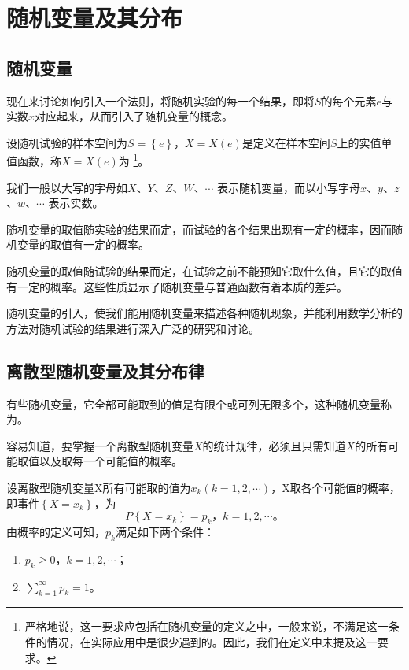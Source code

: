 \chapter{随机变量及其分布}

\section{随机变量}

现在来讨论如何引入一个法则，将随机实验的每一个结果，即将$ S $的每个元素$ e $与实数$ x $对应起来，从而引入了随机变量的概念。

\begin{definition}
	设随机试验的样本空间为$ S = \left\lbrace e \right\rbrace  $，$ X = X(e) $是定义在样本空间$ S $上的实值单值函数，称$ X = X(e) $为 \footnote{严格地说，这一要求应包括在随机变量的定义之中，一般来说，不满足这一条件的情况，在实际应用中是很少遇到的。因此，我们在定义中未提及这一要求。}。
\end{definition}

我们一般以大写的字母如$ X $、$ Y $、$ Z $、$ W $、$ \cdots $ 表示随机变量，而以小写字母$ x $、$ y $、$ z $、$ w $、$ \cdots $ 表示实数。

随机变量的取值随实验的结果而定，而试验的各个结果出现有一定的概率，因而随机变量的取值有一定的概率。

随机变量的取值随试验的结果而定，在试验之前不能预知它取什么值，且它的取值有一定的概率。这些性质显示了随机变量与普通函数有着本质的差异。

随机变量的引入，使我们能用随机变量来描述各种随机现象，并能利用数学分析的方法对随机试验的结果进行深入广泛的研究和讨论。

\section{离散型随机变量及其分布律}

有些随机变量，它全部可能取到的值是有限个或可列无限多个，这种随机变量称为。

容易知道，要掌握一个离散型随机变量$ X $的统计规律，必须且只需知道$ X $的所有可能取值以及取每一个可能值的概率。

设离散型随机变量X所有可能取的值为$ x_k(k=1,2,\cdots) $，X取各个可能值的概率，即事件$ \left\lbrace X = x_k \right\rbrace  $，为
\begin{equation}
	P\left\lbrace X = x_{k} \right\rbrace = p_{k} \text{，} k = 1, 2, \cdots \text{。}
\end{equation}
由概率的定义可知，$ p_{k} $满足如下两个条件：
\begin{enumerate}
	\item $ p_{k} \ge 0\text{，} k = 1, 2, \cdots $；
	\item $ \sum\limits_{k=1}^{\infty}p_{k} = 1 $。
\end{enumerate}

